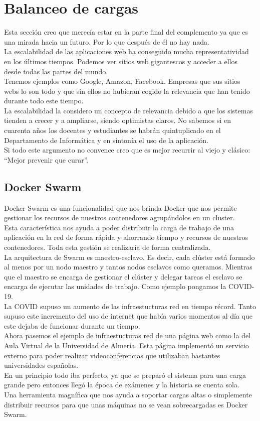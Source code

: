 \section{Balanceo de cargas}
Esta sección creo que merecía estar en la parte final del complemento ya que es una mirada hacia un futuro. Por lo que después de él no hay nada.
\\La escalabilidad de las aplicaciones web ha conseguido mucha representatividad en los últimos tiempos. Podemos ver sitios web gigantescos y acceder a ellos desde todas las partes del mundo.
\\Tenemos ejemplos como Google, Amazon, Facebook. Empresas que sus sitios webs lo son todo y que sin ellos no hubieran cogido la relevancia que han tenido durante todo este tiempo.
\\La escalabilidad la considero un concepto de relevancia debido a que los sistemas tienden a crecer y a ampliarse, siendo optimistas claros. No sabemos si en cuarenta años los docentes y estudiantes se habrán quintuplicado en el Departamento de Informática y en sintonía el uso de la aplicación.
\\Si todo este argumento no convence creo que es mejor recurrir al viejo y clásico: ``Mejor prevenir que curar''.

\subsection{Docker Swarm}
Docker Swarm es una funcionalidad que nos brinda Docker que nos permite gestionar los recursos de nuestros contenedores agrupándolos en un cluster.
\\Esta característica nos ayuda a poder distribuir la carga de trabajo de una aplicación en la red de forma rápida y ahorrando tiempo y recursos de nuestros contenedores. Toda esta gestión se realizaría de forma centralizada.
\\La arquitectura de Swarm es maestro-esclavo. Es decir, cada clúster está formado al menos por un nodo maestro y tantos nodos esclavos como queramos. Mientras que el maestro se encarga de gestionar el clúster y delegar tareas el esclavo se encarga de ejecutar las unidades de trabajo. Como ejemplo pongamos la COVID-19.
\\La COVID supuso un aumento de las infraestucturas red en tiempo récord. Tanto supuso este incremento del uso de internet que había varios momentos al día que este dejaba de funcionar durante un tiempo.
\\Ahora pasemos el ejemplo de infraestucturas red de una página web como la del Aula Virtual de la Universidad de Almería. Esta página implementó un servicio externo para poder realizar videoconferencias que utilizaban bastantes universidades españolas.
\\En un principio todo iba perfecto, ya que se preparó el sistema para una carga grande pero entonces llegó la época de exámenes y la historia se cuenta sola.
\\Una herramienta magnífica que nos ayuda a soportar cargas altas o simplemente distribuir recursos para que unas máquinas no se vean sobrecargadas es Docker Swarm.


